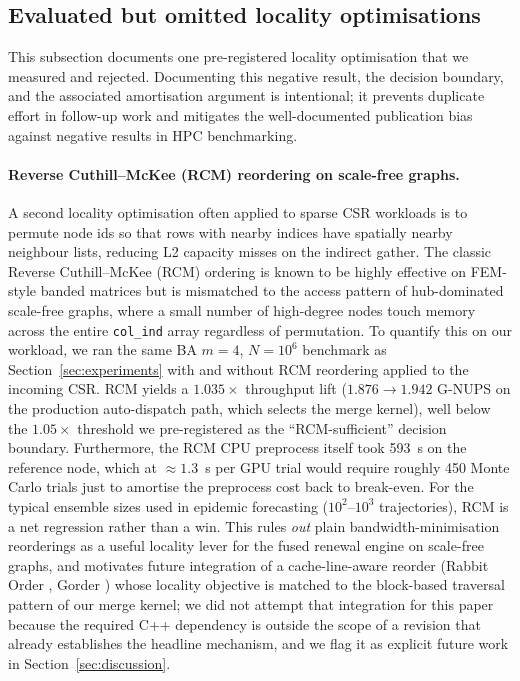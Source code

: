 \subsection{Evaluated but omitted locality optimisations}
\label{sec:rejected_opts}

This subsection documents one pre-registered locality optimisation that we measured and rejected. Documenting this negative result, the decision boundary, and the associated amortisation argument is intentional; it prevents duplicate effort in follow-up work and mitigates the well-documented publication bias against negative results in HPC benchmarking.

\paragraph{Reverse Cuthill--McKee (RCM) reordering on scale-free graphs.}
A second locality optimisation often applied to sparse CSR workloads is to permute node ids so that rows with nearby indices have spatially nearby neighbour lists, reducing L2 capacity misses on the indirect gather. The classic Reverse Cuthill--McKee (RCM) ordering is known to be highly effective on FEM-style banded matrices but is mismatched to the access pattern of hub-dominated scale-free graphs, where a small number of high-degree nodes touch memory across the entire \texttt{col\_ind} array regardless of permutation. To quantify this on our workload, we ran the same BA $m{=}4$, $N = 10^6$ benchmark as Section~\ref{sec:experiments} with and without RCM reordering applied to the incoming CSR. RCM yields a $1.035\times$ throughput lift ($1.876 \to 1.942$ G-NUPS on the production auto-dispatch path, which selects the merge kernel), well below the $1.05\times$ threshold we pre-registered as the ``RCM-sufficient'' decision boundary. Furthermore, the RCM CPU preprocess itself took 593~s on the reference node, which at $\approx 1.3$~s per GPU trial would require roughly 450 Monte Carlo trials just to amortise the preprocess cost back to break-even. For the typical ensemble sizes used in epidemic forecasting ($10^2$--$10^3$ trajectories), RCM is a net regression rather than a win. This rules \emph{out} plain bandwidth-minimisation reorderings as a useful locality lever for the fused renewal engine on scale-free graphs, and motivates future integration of a cache-line-aware reorder (Rabbit Order \citep{arai2016rabbit}, Gorder \citep{wei2016gorder}) whose locality objective is matched to the block-based traversal pattern of our merge kernel; we did not attempt that integration for this paper because the required C++ dependency is outside the scope of a revision that already establishes the headline mechanism, and we flag it as explicit future work in Section~\ref{sec:discussion}.

